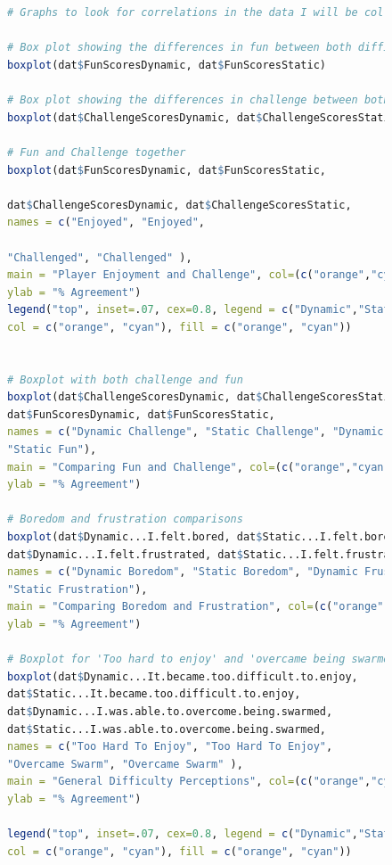 \documentclass[journal]{IEEEtran}
\begin{document}
 
\begin{center}
\begin{figure}


\begin{lstlisting}[language=R]


# Graphs to look for correlations in the data I will be collecting

# Box plot showing the differences in fun between both difficulty settings
boxplot(dat$FunScoresDynamic, dat$FunScoresStatic)

# Box plot showing the differences in challenge between both difficulty settings
boxplot(dat$ChallengeScoresDynamic, dat$ChallengeScoresStatic)

# Fun and Challenge together
boxplot(dat$FunScoresDynamic, dat$FunScoresStatic, 

dat$ChallengeScoresDynamic, dat$ChallengeScoresStatic,
names = c("Enjoyed", "Enjoyed", 

"Challenged", "Challenged" ), 
main = "Player Enjoyment and Challenge", col=(c("orange","cyan")), 
ylab = "% Agreement")
legend("top", inset=.07, cex=0.8, legend = c("Dynamic","Static") , 
col = c("orange", "cyan"), fill = c("orange", "cyan"))


# Boxplot with both challenge and fun
boxplot(dat$ChallengeScoresDynamic, dat$ChallengeScoresStatic, 
dat$FunScoresDynamic, dat$FunScoresStatic, 
names = c("Dynamic Challenge", "Static Challenge", "Dynamic Fun",  
"Static Fun"), 
main = "Comparing Fun and Challenge", col=(c("orange","cyan")), 
ylab = "% Agreement")

# Boredom and frustration comparisons
boxplot(dat$Dynamic...I.felt.bored, dat$Static...I.felt.bored, 
dat$Dynamic...I.felt.frustrated, dat$Static...I.felt.frustrated, 
names = c("Dynamic Boredom", "Static Boredom", "Dynamic Frustration",  
"Static Frustration"), 
main = "Comparing Boredom and Frustration", col=(c("orange","cyan")), 
ylab = "% Agreement")

# Boxplot for 'Too hard to enjoy' and 'overcame being swarmed'
boxplot(dat$Dynamic...It.became.too.difficult.to.enjoy, 
dat$Static...It.became.too.difficult.to.enjoy, 
dat$Dynamic...I.was.able.to.overcome.being.swarmed, 
dat$Static...I.was.able.to.overcome.being.swarmed,
names = c("Too Hard To Enjoy", "Too Hard To Enjoy", 
"Overcame Swarm", "Overcame Swarm" ), 
main = "General Difficulty Perceptions", col=(c("orange","cyan")), 
ylab = "% Agreement")

legend("top", inset=.07, cex=0.8, legend = c("Dynamic","Static") , 
col = c("orange", "cyan"), fill = c("orange", "cyan"))



\end{lstlisting}

\end{figure}

\end{center}
\end{document}
